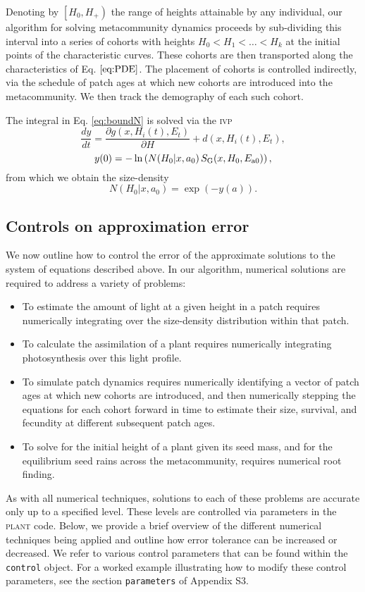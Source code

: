 \documentclass[10pt,twoside]{article}
\newcommand{\plant}{\textsc{plant}}
\begin{document}
Denoting by \(\left[H_0, H_{ + } \right)\) the range of heights
attainable by any individual, our algorithm for solving metacommunity dynamics proceeds by sub-dividing
this interval into a series of cohorts with heights
\(H_0 < H_1 < \ldots < H_k\) at the initial points of the characteristic curves. These cohorts are then transported along
the characteristics of Eq. \(\ref{eq:PDE}\). The placement of cohorts
is controlled indirectly, via the schedule of patch ages at which
new cohorts are introduced into the metacommunity. We then track the
demography of each such cohort.

The integral in Eq. \ref{eq:boundN} is solved via the \textsc{ivp}
\[\frac{dy}{dt} = \frac{\partial g(x, H_i(t), E_t)}{\partial H} + d(x, H_i(t), E_t),\]
\[ y(0) = - \ln\left(N(H_0 | x, a_0) \, S_{\rm G} (x, H_0, E_{{\rm a}0}) \right),\]
from which we obtain the size-density
\[N(H_0 | x, a_0) = \exp( - y(a)).\]

\subsection{Controls on approximation error}

We now outline how to control the error of the approximate solutions
to the system of equations described above. In our algorithm, numerical solutions are required to address a variety of problems:
\begin{itemize}
\item To estimate the amount of light at a given height in a patch requires
numerically integrating over the size-density distribution within that patch.
\item To calculate the
assimilation of a plant requires numerically integrating
photosynthesis over this light profile.
\item To simulate patch dynamics
requires numerically identifying a vector of patch ages at which new cohorts are
introduced, and then numerically stepping the equations for each cohort forward in time to
estimate their size, survival, and fecundity at different subsequent patch ages.
\item To solve for the initial height of a plant given
its seed mass, and for the equilibrium seed rains across the
metacommunity, requires numerical root finding.
\end{itemize}

As with all numerical techniques, solutions to each of these problems are
accurate only up to a specified level. These levels are controlled
via parameters in the {\plant} code. Below, we
provide a brief overview of the different numerical techniques being
applied and outline how error tolerance can be increased or decreased.
We refer to various control parameters that can be found within the
\texttt{control} object. For a worked example illustrating how to modify these control parameters,
see the section \texttt{parameters} of Appendix S3.
\end{document}
